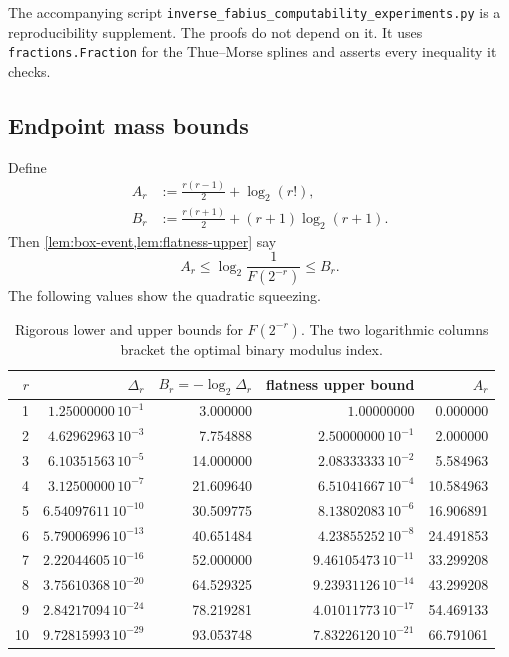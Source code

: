 \documentclass[11pt,oneside]{article}
\theoremstyle{definition}
\theoremstyle{remark}
\numberwithin{equation}{section}
\begin{document}
The accompanying script
\texttt{inverse\_fabius\_computability\_experiments.py} is a reproducibility
supplement.  The proofs do not depend on it.  It uses
\texttt{fractions.Fraction} for the Thue--Morse splines and asserts every
inequality it checks.

\subsection{Endpoint mass bounds}

Define
\begin{align}
 A_r&:=\frac{r(r-1)}2+\log_2(r!),\label{eq:A-r}\\
 B_r&:=\frac{r(r+1)}2+(r+1)\log_2(r+1).\label{eq:B-r}
\end{align}
Then \cref{lem:box-event,lem:flatness-upper} say
\begin{equation}\label{eq:AB-bracket}
 A_r\le\log_2\frac1{F(2^{-r})}\le B_r.
\end{equation}
The following values show the quadratic squeezing.

\begin{table}[htbp]
\centering
\small
\begin{tabular}{@{}r rr rr@{}}
\toprule
$r$ & $\Delta_r$ & $B_r=-\log_2\Delta_r$
    & flatness upper bound & $A_r$\\
\midrule
1  & $1.25000000\,10^{-1}$ & 3.000000
   & $1.00000000$          & 0.000000\\
2  & $4.62962963\,10^{-3}$ & 7.754888
   & $2.50000000\,10^{-1}$ & 2.000000\\
3  & $6.10351563\,10^{-5}$ & 14.000000
   & $2.08333333\,10^{-2}$ & 5.584963\\
4  & $3.12500000\,10^{-7}$ & 21.609640
   & $6.51041667\,10^{-4}$ & 10.584963\\
5  & $6.54097611\,10^{-10}$ & 30.509775
   & $8.13802083\,10^{-6}$ & 16.906891\\
6  & $5.79006996\,10^{-13}$ & 40.651484
   & $4.23855252\,10^{-8}$ & 24.491853\\
7  & $2.22044605\,10^{-16}$ & 52.000000
   & $9.46105473\,10^{-11}$ & 33.299208\\
8  & $3.75610368\,10^{-20}$ & 64.529325
   & $9.23931126\,10^{-14}$ & 43.299208\\
9  & $2.84217094\,10^{-24}$ & 78.219281
   & $4.01011773\,10^{-17}$ & 54.469133\\
10 & $9.72815993\,10^{-29}$ & 93.053748
   & $7.83226120\,10^{-21}$ & 66.791061\\
\bottomrule
\end{tabular}
\caption{Rigorous lower and upper bounds for $F(2^{-r})$.  The two logarithmic
columns bracket the optimal binary modulus index.}
\label{tab:endpoint-bounds}
\end{table}
\end{document}
